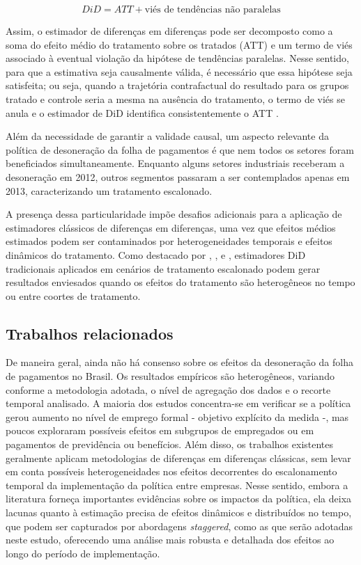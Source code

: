 \documentclass[12pt,a4paper,oneside]{article}
\begin{document}
\begin{equation*}
	DiD = ATT + \text{viés de tendências não paralelas}
\end{equation*}

Assim, o estimador de diferenças em diferenças pode ser decomposto como a soma do efeito médio do tratamento sobre os tratados (ATT) e um termo de viés associado à eventual violação da hipótese de tendências paralelas. Nesse sentido, para que a estimativa seja causalmente válida, é necessário que essa hipótese seja satisfeita; ou seja, quando a trajetória contrafactual do resultado para os grupos tratado e controle seria a mesma na ausência do tratamento, o termo de viés se anula e o estimador de DiD identifica consistentemente o ATT \citep{angrist}.

Além da necessidade de garantir a validade causal, um aspecto relevante da política de desoneração da folha de pagamentos é que nem todos os setores foram beneficiados simultaneamente. Enquanto alguns setores industriais receberam a desoneração em 2012, outros segmentos passaram a ser contemplados apenas em 2013, caracterizando um tratamento escalonado.

A presença dessa particularidade impõe desafios adicionais para a aplicação de estimadores clássicos de diferenças em diferenças, uma vez que efeitos médios estimados podem ser contaminados por heterogeneidades temporais e efeitos dinâmicos do tratamento. Como destacado por \citet{Callaway2021}, \citet{Sun2021}, \citet{DeChaisemartin2020} e \citet{GoodmanBacon2021}, estimadores DiD tradicionais aplicados em cenários de tratamento escalonado podem gerar resultados enviesados quando os efeitos do tratamento são heterogêneos no tempo ou entre coortes de tratamento. 

		
		\subsection{Trabalhos relacionados}
		
		
		De maneira geral, ainda não há consenso sobre os efeitos da desoneração da folha de pagamentos no Brasil. Os resultados empíricos são heterogêneos, variando conforme a metodologia adotada, o nível de agregação dos dados e o recorte temporal analisado. A maioria dos estudos concentra-se em verificar se a política gerou aumento no nível de emprego formal - objetivo explícito da medida -, mas poucos exploraram possíveis efeitos em subgrupos de empregados ou em pagamentos de previdência ou benefícios. Além disso, os trabalhos existentes geralmente aplicam metodologias de diferenças em diferenças clássicas, sem levar em conta possíveis heterogeneidades nos efeitos decorrentes do escalonamento temporal da implementação da política entre empresas. Nesse sentido, embora a literatura forneça importantes evidências sobre os impactos da política, ela deixa lacunas quanto à estimação precisa de efeitos dinâmicos e distribuídos no tempo, que podem ser capturados por abordagens \emph{staggered}, como as que serão adotadas neste estudo, oferecendo uma análise mais robusta e detalhada dos efeitos ao longo do período de implementação.
\end{document}
